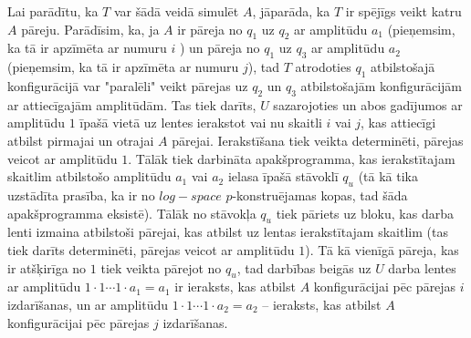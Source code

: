 \documentclass{ludis}
\begin{document}
Lai parādītu, ka $T$ var šādā veidā simulēt $A$, jāparāda, ka $T$ ir spējīgs veikt katru $A$ pāreju. Parādīsim, ka, ja $A$ ir pāreja no $q_1$ uz $q_2$ ar amplitūdu $a_1$ (pieņemsim, ka tā ir apzīmēta ar numuru $i$ ) un pāreja no $q_1$ uz $q_3$ ar amplitūdu $a_2$ (pieņemsim, ka tā ir apzīmēta ar numuru $j$), tad $T$ atrodoties $q_1$ atbilstošajā konfigurācijā var "paralēli" veikt pārejas uz $q_2$ un $q_3$ atbilstošajām konfigurācijām ar attiecīgajām amplitūdām. Tas tiek darīts, $U$ sazarojoties un abos gadījumos ar amplitūdu $1$ īpašā vietā uz lentes ierakstot vai nu skaitli $i$ vai $j$, kas attiecīgi atbilst pirmajai un otrajai $A$ pārejai. Ierakstīšana tiek veikta determinēti, pārejas veicot ar amplitūdu $1$. Tālāk tiek darbināta apakšprogramma, kas ierakstītajam skaitlim atbilstošo amplitūdu $a_1$ vai $a_2$ ielasa īpašā stāvoklī $q_u$ (tā kā tika uzstādīta prasība, ka ir no $log-space$ $p$-konstruējamas kopas, tad šāda apakšprogramma eksistē). Tālāk no stāvokļa $q_u$ tiek pāriets uz bloku, kas darba lenti izmaina atbilstoši pārejai, kas atbilst uz lentas ierakstītajam skaitlim (tas tiek darīts determinēti, pārejas veicot ar amplitūdu $1$). Tā kā vienīgā pāreja, kas ir atšķirīga no $1$ tiek veikta pārejot no $q_u$, tad darbības beigās uz $U$ darba lentes ar amplitūdu $1 \cdot 1 \cdots 1 \cdot a_1 = a_1$ ir ieraksts, kas atbilst $A$ konfigurācijai pēc pārejas $i$ izdarīšanas, un ar amplitūdu $1 \cdot 1 \cdots 1 \cdot a_2 = a_2$ -- ieraksts, kas atbilst $A$ konfigurācijai pēc pārejas $j$ izdarīšanas.
\end{document}
